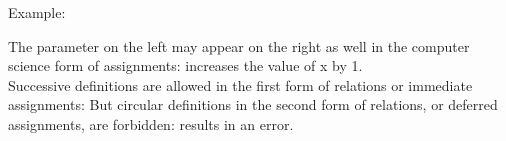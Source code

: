 Example: 

The parameter on the left may appear on the right as well in the
computer science form of assignments: 
increases the value of x by 1. \\


Successive definitions are allowed in the first form of relations or 
immediate assignments:
But circular definitions in the second form of relations, or
deferred assignments, are forbidden: 
results in an error.





